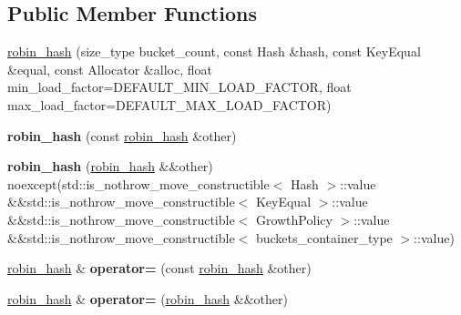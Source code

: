\subsection*{Public Member Functions}
\begin{DoxyCompactItemize}
\item 
\mbox{\hyperlink{classtsl_1_1detail__robin__hash_1_1robin__hash_a6941f1aadf678dc6ac97cf8f6517b3b6}{robin\+\_\+hash}} (size\+\_\+type bucket\+\_\+count, const Hash \&hash, const Key\+Equal \&equal, const Allocator \&alloc, float min\+\_\+load\+\_\+factor=D\+E\+F\+A\+U\+L\+T\+\_\+\+M\+I\+N\+\_\+\+L\+O\+A\+D\+\_\+\+F\+A\+C\+T\+OR, float max\+\_\+load\+\_\+factor=D\+E\+F\+A\+U\+L\+T\+\_\+\+M\+A\+X\+\_\+\+L\+O\+A\+D\+\_\+\+F\+A\+C\+T\+OR)
\item 
\mbox{\label{classtsl_1_1detail__robin__hash_1_1robin__hash_aaad58cb65e5ddfea6c508bdb6fa76d09}} 
{\bfseries robin\+\_\+hash} (const \mbox{\hyperlink{classtsl_1_1detail__robin__hash_1_1robin__hash}{robin\+\_\+hash}} \&other)
\item 
\mbox{\label{classtsl_1_1detail__robin__hash_1_1robin__hash_afdf28d523b69f310d550b5e4d5ce6715}} 
{\bfseries robin\+\_\+hash} (\mbox{\hyperlink{classtsl_1_1detail__robin__hash_1_1robin__hash}{robin\+\_\+hash}} \&\&other) noexcept(std\+::is\+\_\+nothrow\+\_\+move\+\_\+constructible$<$ Hash $>$\+::value \&\&std\+::is\+\_\+nothrow\+\_\+move\+\_\+constructible$<$ Key\+Equal $>$\+::value \&\&std\+::is\+\_\+nothrow\+\_\+move\+\_\+constructible$<$ Growth\+Policy $>$\+::value \&\&std\+::is\+\_\+nothrow\+\_\+move\+\_\+constructible$<$ buckets\+\_\+container\+\_\+type $>$\+::value)
\item 
\mbox{\label{classtsl_1_1detail__robin__hash_1_1robin__hash_a3d61bc7d267efb08f538615a48569a7b}} 
\mbox{\hyperlink{classtsl_1_1detail__robin__hash_1_1robin__hash}{robin\+\_\+hash}} \& {\bfseries operator=} (const \mbox{\hyperlink{classtsl_1_1detail__robin__hash_1_1robin__hash}{robin\+\_\+hash}} \&other)
\item 
\mbox{\label{classtsl_1_1detail__robin__hash_1_1robin__hash_ad1cd112d25acf2d6c5dddb5801dcf5a5}} 
\mbox{\hyperlink{classtsl_1_1detail__robin__hash_1_1robin__hash}{robin\+\_\+hash}} \& {\bfseries operator=} (\mbox{\hyperlink{classtsl_1_1detail__robin__hash_1_1robin__hash}{robin\+\_\+hash}} \&\&other)

\end{DoxyCompactItemize}
